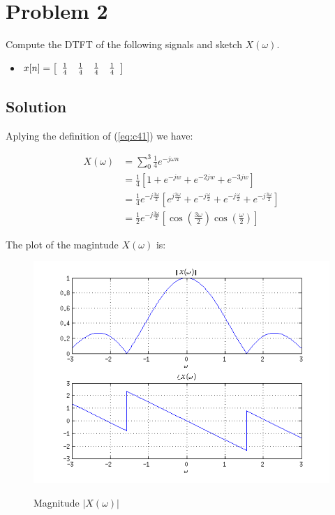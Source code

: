 \section*{Problem 2}

Compute the DTFT of the following signals and sketch $X(\omega)$.

\begin{itemize}
\item 
$x[n] =
\left[
\begin{array}{c c c c}
 \frac{1}{4}&  \frac{1}{4}& \frac{1}{4}& \frac{1}{4}
 \end{array}
 \right]
$
\end{itemize} 

\subsection*{Solution}

Aplying the definition of (\ref{eq:c41}) we have:

\begin{equation*}
\begin{aligned}
X(\omega) &= \displaystyle\sum_{0}^{3} \frac{1}{4} e^{-j \omega n} \\
&= \frac{1}{4} [1 + e^{-jw} + e^{-2jw} + e^{-3jw}] \\
&= \frac{1}{4} e^{-j \frac{3 \omega}{2}}
		[e^{j \frac{3 \omega}{2}} + e^{-j \frac{\omega}{2}} + 
		 e^{- j \frac{\omega}{2}} + e^{-j \frac{3 \omega}{2}} ] \\
&= \frac{1}{2}  e^{-j \frac{3 \omega}{2}} [\cos(\frac{3 \omega}{2})\cos(\frac{\omega}{2})]
\end{aligned}
\end{equation*} 

The plot of the magintude $X(\omega)$ is:

\begin{figure}[H]
\caption{Magnitude $|X(\omega)|$}
\centering
\includegraphics[width=1.0\textwidth]{figs/c4p1a.png}
\label{fig:c4p1a}
\end{figure} 

